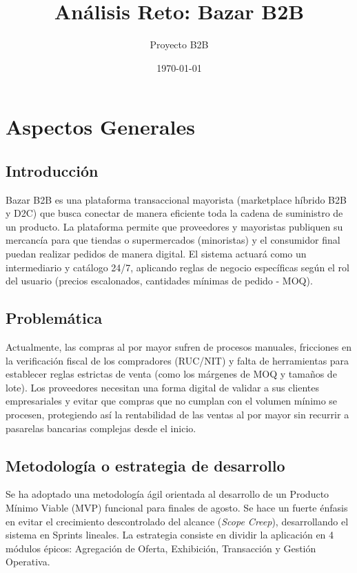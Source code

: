 \documentclass[12pt,a4paper]{report}
\title{\textbf{Análisis Reto: Bazar B2B}}
\author{Proyecto B2B}
\date{\today}
\begin{document}
\maketitle

\renewcommand{\contentsname}{Sumario}
\tableofcontents
\newpage

\chapter{Aspectos Generales}

\section{Introducción}
Bazar B2B es una plataforma transaccional mayorista (marketplace híbrido B2B y D2C) que busca conectar de manera eficiente toda la cadena de suministro de un producto. La plataforma permite que proveedores y mayoristas publiquen su mercancía para que tiendas o supermercados (minoristas) y el consumidor final puedan realizar pedidos de manera digital. El sistema actuará como un intermediario y catálogo 24/7, aplicando reglas de negocio específicas según el rol del usuario (precios escalonados, cantidades mínimas de pedido - MOQ).

\section{Problemática}  
Actualmente, las compras al por mayor sufren de procesos manuales, fricciones en la verificación fiscal de los compradores (RUC/NIT) y falta de herramientas para establecer reglas estrictas de venta (como los márgenes de MOQ y tamaños de lote). Los proveedores necesitan una forma digital de validar a sus clientes empresariales y evitar que compras que no cumplan con el volumen mínimo se procesen, protegiendo así la rentabilidad de las ventas al por mayor sin recurrir a pasarelas bancarias complejas desde el inicio.

\section{Metodología o estrategia de desarrollo}
Se ha adoptado una metodología ágil orientada al desarrollo de un Producto Mínimo Viable (MVP) funcional para finales de agosto. Se hace un fuerte énfasis en evitar el crecimiento descontrolado del alcance (\textit{Scope Creep}), desarrollando el sistema en Sprints lineales. La estrategia consiste en dividir la aplicación en 4 módulos épicos: Agregación de Oferta, Exhibición, Transacción y Gestión Operativa.
\end{document}
